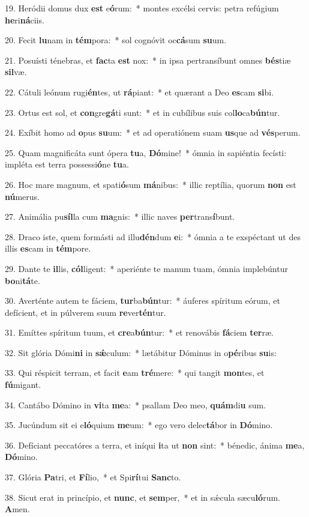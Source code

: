 19. Heródii domus dux \textbf{est} e\textbf{ó}rum:~*  montes excélsi cervis: petra refúgium \textbf{he}ri\textbf{ná}ciis.\

20. Fecit \textbf{lu}nam in \textbf{tém}pora:~*  sol cognóvit oc\textbf{cá}sum \textbf{su}um.\

21. Posuísti ténebras, et \textbf{fac}ta \textbf{est} nox:~*  in ipsa pertransíbunt omnes \textbf{bés}tiæ \textbf{sil}væ.\

22. Cátuli leónum rugi\textbf{én}tes, ut \textbf{rá}piant:~*  et quærant a Deo \textbf{es}cam \textbf{si}bi.\

23. Ortus est sol, et \textbf{con}gre\textbf{gá}ti sunt:~*  et in cubílibus suis col\textbf{lo}ca\textbf{bún}tur.\

24. Exíbit homo ad \textbf{o}pus \textbf{su}um:~*  et ad operatiónem suam \textbf{us}que ad \textbf{vés}perum.\

25. Quam magnificáta sunt ópera \textbf{tu}a, \textbf{Dó}mine!~*  ómnia in sapiéntia fecísti: impléta est terra possessi\textbf{ó}ne \textbf{tu}a.\

26. Hoc mare magnum, et spati\textbf{ó}sum \textbf{má}nibus:~*  illic reptília, quorum \textbf{non} est \textbf{nú}merus.\

27. Animália pu\textbf{síl}la cum \textbf{ma}gnis:~*  illic naves \textbf{per}trans\textbf{í}bunt.\

28. Draco iste, quem formásti ad illu\textbf{dén}dum \textbf{e}i:~*  ómnia a te exspéctant ut des illis \textbf{es}cam in \textbf{tém}pore.\

29. Dante te \textbf{il}lis, \textbf{cól}ligent:~*  aperiénte te manum tuam, ómnia implebúntur \textbf{bo}ni\textbf{tá}te.\

30. Averténte autem te fáciem, \textbf{tur}ba\textbf{bún}tur:~*  áuferes spíritum eórum, et defícient, et in púlverem suum \textbf{re}ver\textbf{tén}tur.\

31. Emíttes spíritum tuum, et \textbf{cre}a\textbf{bún}tur:~*  et renovábis \textbf{fá}ciem \textbf{ter}ræ.\

32. Sit glória Dómi\textbf{ni} in \textbf{sǽ}culum:~*  lætábitur Dóminus in o\textbf{pé}ribus \textbf{su}is:\

33. Qui réspicit terram, et facit \textbf{e}am \textbf{tré}mere:~*  qui tangit \textbf{mon}tes, et \textbf{fú}migant.\

34. Cantábo Dómino in \textbf{vi}ta \textbf{me}a:~*  psallam Deo meo, \textbf{quám}di\textbf{u} sum.\

35. Jucúndum sit ei e\textbf{ló}quium \textbf{me}um:~*  ego vero delec\textbf{tá}bor in \textbf{Dó}mino.\

36. Defíciant peccatóres a terra, et iníqui \textbf{i}ta ut \textbf{non} sint:~*  bénedic, ánima \textbf{me}a, \textbf{Dó}mino.\

37. Glória \textbf{Pa}tri, et \textbf{Fí}lio,~*  et Spi\textbf{rí}tui \textbf{Sanc}to.\

38. Sicut erat in princípio, et \textbf{nunc}, et \textbf{sem}per,~*  et in sǽcula sæcu\textbf{ló}rum. \textbf{A}men.\

